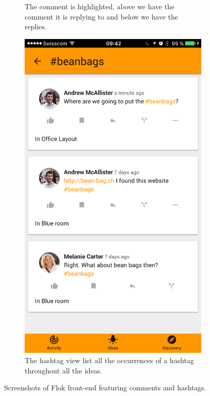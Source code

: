 \documentclass[a4paper,12pt, oneside]{article}
\begin{document}
\begin{figure}[!htb]
\begin{subfigure}[t]{.32\textwidth}
        \caption{The comment is highlighted, above we have the comment it is replying to and below we have the replies.}
        \label{fig.commentView}
    \end{subfigure}
    \hfill
    \begin{subfigure}[t]{.32\textwidth}
        \centering
        \includegraphics[width=\textwidth]{images/hashtagView.png}
        \caption{The hashtag view list all the occurrences of a hashtag throughout all the ideas.}
        \label{fig.hashtagView}
    \end{subfigure}
    \hfill\null
    \caption{Screenshots of Flok front-end featuring comments and hashtags.}
\end{figure}
\end{document}
